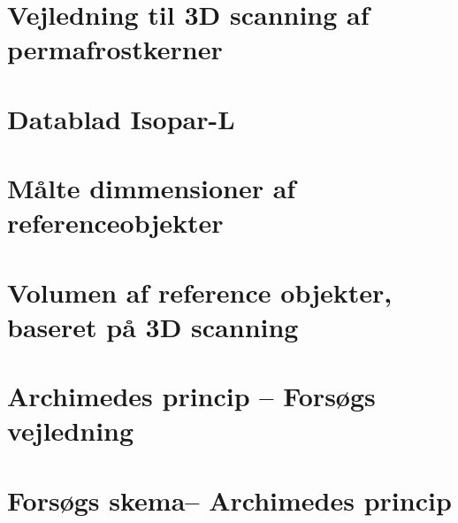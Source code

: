 
\clearpage
\FloatBlock
\chapter{Vejledning til 3D scanning af permafrostkerner}




\clearpage
\FloatBlock
\chapter{Datablad Isopar-L}


\clearpage
\FloatBlock
\chapter{Målte dimmensioner af referenceobjekter}


\clearpage
\FloatBlock
\chapter{Volumen af reference objekter, baseret på 3D scanning}


\clearpage
\FloatBlock
\chapter{Archimedes princip -- Forsøgs vejledning}



 \clearpage
 \FloatBlock
 \chapter{Forsøgs skema-- Archimedes princip}
 


